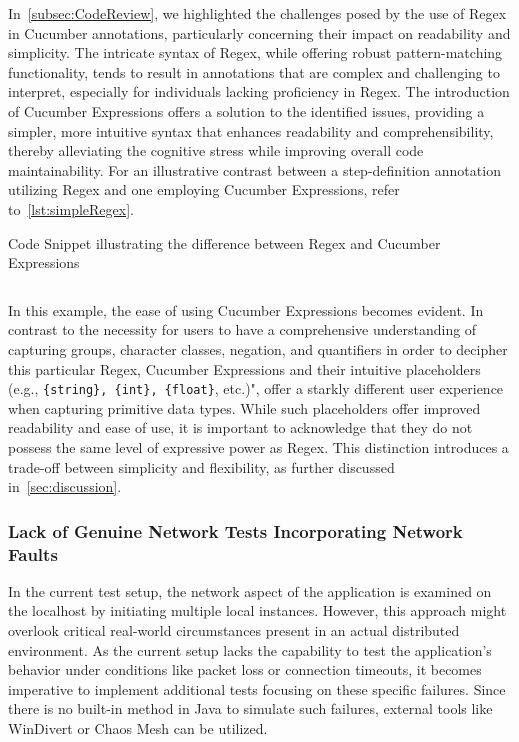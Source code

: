 In~\cref{subsec:CodeReview}, we highlighted the challenges posed by the use of \ac{Regex} in Cucumber annotations, particularly concerning their impact on readability and simplicity. The intricate syntax of \ac{Regex}, while offering robust pattern-matching functionality, tends to result in annotations that are complex and challenging to interpret, especially for individuals lacking proficiency in \ac{Regex}. The introduction of Cucumber Expressions offers a solution to the identified issues, providing a simpler, more intuitive syntax that enhances readability and comprehensibility, thereby alleviating the cognitive stress while improving overall code maintainability. For an illustrative contrast between a step-definition annotation utilizing \ac{Regex} and one employing Cucumber Expressions, refer to~\cref{lst:simpleRegex}.

\begin{listing}[!ht]
\caption{Code Snippet illustrating the difference between \ac{Regex} and Cucumber Expressions}
\label{lst:simpleRegex}
\inputminted{java}{files/code/simpleRegex.java}
\end{listing}

In this example, the ease of using Cucumber Expressions becomes evident. In contrast to the necessity for users to have a comprehensive understanding of capturing groups, character classes, negation, and quantifiers in order to decipher this particular \ac{Regex}, Cucumber Expressions and their intuitive placeholders (e.g., \verb|{string}, {int}, {float}|, etc.)", offer a starkly different user experience when capturing primitive data types. While such placeholders offer improved readability and ease of use, it is important to acknowledge that they do not possess the same level of expressive power as \ac{Regex}. This distinction introduces a trade-off between simplicity and flexibility, as further discussed in~\cref{sec:discussion}. 


\subsubsection{Lack of Genuine Network Tests Incorporating Network Faults}
\label{sub:lack-network-tests}

In the current test setup, the network aspect of the application is examined on the localhost by initiating multiple local instances. However, this approach might overlook critical real-world circumstances present in an actual distributed environment. As the current setup lacks the capability to test the application's behavior under conditions like packet loss or connection timeouts, it becomes imperative to implement additional tests focusing on these specific failures. Since there is no built-in method in Java to simulate such failures, external tools like WinDivert or Chaos Mesh can be utilized.

